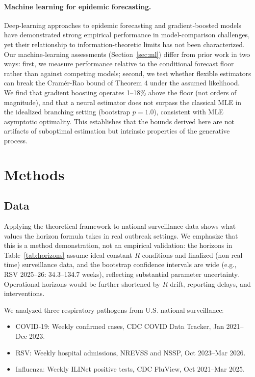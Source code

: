 \documentclass[review]{elsarticle}
\theoremstyle{plain}
\theoremstyle{definition}
\begin{document}
\paragraph{Machine learning for epidemic forecasting.}
Deep-learning approaches to epidemic forecasting \citep{salinas2020deepar, colubri2019machine} and gradient-boosted models \citep{ke2017lightgbm} have demonstrated strong empirical performance in model-comparison challenges, yet their relationship to information-theoretic limits has not been characterized. Our machine-learning assessments (Section~\ref{sec:ml}) differ from prior work in two ways: first, we measure performance relative to the conditional forecast floor rather than against competing models; second, we test whether flexible estimators can break the Cram\'er-Rao bound of Theorem 4 under the assumed likelihood. We find that gradient boosting operates 1--18\% above the floor (not orders of magnitude), and that a neural estimator does not surpass the classical MLE in the idealized branching setting (bootstrap $p = 1.0$), consistent with MLE asymptotic optimality. This establishes that the bounds derived here are not artifacts of suboptimal estimation but intrinsic properties of the generative process.


\section{Methods}
\subsection{Data}\label{sec:data}


Applying the theoretical framework to national surveillance data shows what values the horizon formula takes in real outbreak settings. We emphasize that this is a method demonstration, not an empirical validation: the horizons in Table~\ref{tab:horizons} assume ideal constant-$R$ conditions and finalized (non-real-time) surveillance data, and the bootstrap confidence intervals are wide (e.g., RSV 2025--26: 34.3--134.7 weeks), reflecting substantial parameter uncertainty. Operational horizons would be further shortened by $R$ drift, reporting delays, and interventions.

We analyzed three respiratory pathogens from U.S. national surveillance:
\begin{itemize}
\item COVID-19: Weekly confirmed cases, CDC COVID Data Tracker, Jan 2021--Dec 2023.
\item RSV: Weekly hospital admissions, NREVSS and NSSP, Oct 2023--Mar 2026.
\item Influenza: Weekly ILINet positive tests, CDC FluView, Oct 2021--Mar 2025.
\end{itemize}
\end{document}
